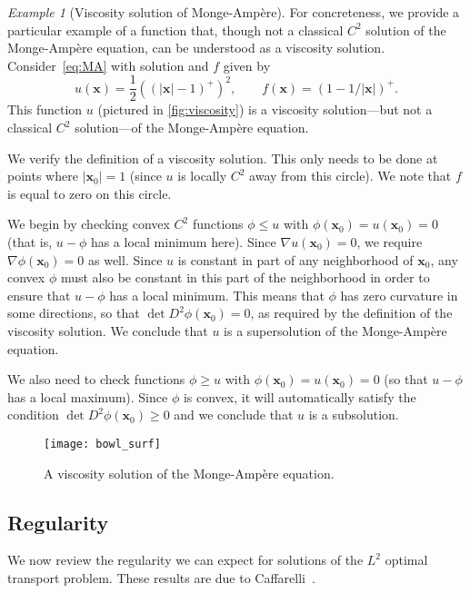 \documentclass{amsart}
\theoremstyle{lemma}
\theoremstyle{remark}
\newtheorem{example}{Example}
\begin{document}
\begin{example}[Viscosity solution of {{Monge-Amp\`ere}\xspace}]
For concreteness, we provide a particular example of a function that, though not a classical $C^2$ solution of the {{Monge-Amp\`ere}\xspace} equation, can be understood as a viscosity solution.  Consider~\eqref{eq:MA} with solution and $f$ given by
\[ 
u({\mathbf{x}}) = \frac{1}{2}(({\left\vert{\mathbf{x}}\right\vert}-1)^+)^2, 
\qquad
f({\mathbf{x}}) = (1-1/{\left\vert{\mathbf{x}}\right\vert})^+. \]
This function $u$ (pictured in \autoref{fig:viscosity}) is a viscosity solution---but not a classical $C^2$ solution---of the {{Monge-Amp\`ere}\xspace} equation.

We verify the definition of a viscosity solution.  This only needs to be done at points where ${\left\vert{\mathbf{x}_0}\right\vert}=1$ (since $u$ is locally $C^2$ away from this circle).  We note that $f$ is equal to zero on this circle.

We begin by checking convex $C^2$ functions $\phi \leq u$ with $\phi({\mathbf{x}_0}) = u({\mathbf{x}_0}) = 0$ (that is, $u-\phi$ has a local minimum here).  
Since $\nabla u({\mathbf{x}_0}) = 0$, we require $\nabla \phi({\mathbf{x}_0}) = 0$ as well.  Since $u$ is constant in part of any neighborhood of ${\mathbf{x}_0}$, any convex $\phi$ must also be constant in this part of the neighborhood in order to ensure that $u-\phi$ has a local minimum.  This means that $\phi$ has zero curvature in some directions, so that $\det D^2 \phi({\mathbf{x}_0}) = 0$, as required by the definition of the viscosity solution.  We conclude that $u$ is a supersolution of the {{Monge-Amp\`ere}\xspace} equation.

We also need to check functions $\phi \geq u$ with $\phi({\mathbf{x}_0}) = u({\mathbf{x}_0}) = 0$ (so that $u-\phi$ has a local maximum).  Since $\phi$ is convex, it will automatically satisfy the condition $\det D^2\phi({\mathbf{x}_0}) \geq 0$ and we conclude that $u$ is a subsolution. 
\end{example}

\begin{figure}[htdp]
	\centering
        {\texttt{[image: bowl\_surf]}}
  	\vspace*{-10pt}\caption{A viscosity solution of the {{Monge-Amp\`ere}\xspace} equation.}
  	\label{fig:viscosity}
\end{figure} 

\subsection{Regularity}\label{sec:reg}
We now review the regularity we can expect for solutions of the $L^2$ optimal transport problem.  These results are due to Caffarelli~\cite{CafBdyReg,CafRegMap,CafBdyReg2}.
\end{document}
